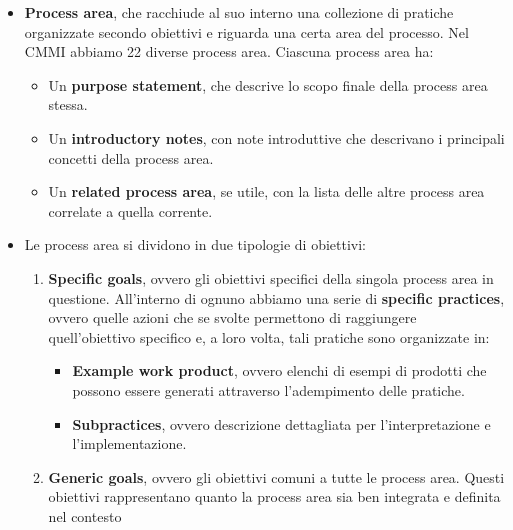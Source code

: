 \begin{itemize}
      \item \textbf{Process area}, che racchiude al suo interno una collezione di
            pratiche organizzate secondo obiettivi e riguarda una certa area del
            processo. Nel CMMI abbiamo 22 diverse process area. Ciascuna process
            area ha:
            \begin{itemize}
                  \item Un \textbf{purpose statement}, che descrive lo scopo finale
                        della process area stessa.
                  \item Un \textbf{introductory notes}, con note introduttive
                        che descrivano i principali concetti della process area.
                  \item Un \textbf{related process area}, se utile, con la lista
                        delle altre process area correlate a quella corrente.
            \end{itemize}
      \item Le process area si dividono in due tipologie di obiettivi:
            \begin{enumerate}
                  \item \textbf{Specific goals}, ovvero gli obiettivi specifici
                        della singola process area in questione. All'interno di
                        ognuno abbiamo una serie di \textbf{specific practices},
                        ovvero quelle azioni che se svolte permettono di raggiungere
                        quell'obiettivo specifico e, a loro volta, tali pratiche
                        sono organizzate in:
                        \begin{itemize}
                              \item \textbf{Example work product}, ovvero elenchi
                                    di esempi di prodotti che possono essere generati
                                    attraverso l'adempimento delle pratiche.
                              \item \textbf{Subpractices}, ovvero descrizione
                                    dettagliata per l'interpretazione e l'implementazione.
                        \end{itemize}
                  \item \textbf{Generic goals}, ovvero gli obiettivi comuni a tutte
                        le process area. Questi obiettivi rappresentano quanto la
                        process area sia ben integrata e definita nel contesto

\end{enumerate}
\end{itemize}
